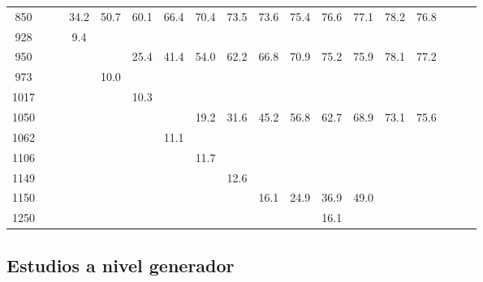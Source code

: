 \begin{table}[ht]
\begin{tabular}{c|ccccccccccccccccc}
    850  &         &        &  34.2    &   50.7   &   60.1   &   66.4   &   70.4    &   73.5    &    73.6  &   75.4  &   76.6 & 77.1 & 78.2 &  76.8 \\
    928  &         &        &   9.4    &          &          &          &           &           &          &         &        &      &      &       \\
    950  &         &        &          &          &   25.4   &   41.4   &   54.0    &   62.2    &    66.8  &   70.9  &   75.2 & 75.9 & 78.1 &  77.2 \\
    973  &         &        &          &   10.0   &          &          &           &           &          &         &        &      &      &       \\
    1017 &         &        &          &          &   10.3   &          &           &           &          &         &        &      &      &       \\
    1050 &         &        &          &          &          &          &   19.2    &   31.6    &    45.2  &   56.8  &   62.7 & 68.9 & 73.1 &  75.6 \\
    1062 &         &        &          &          &          &   11.1   &           &           &          &         &        &      &      &       \\
    1106 &         &        &          &          &          &          &   11.7    &           &          &         &        &      &      &       \\
    1149 &         &        &          &          &          &          &           &   12.6    &          &         &        &      &      &       \\
    1150 &         &        &          &          &          &          &           &           &    16.1  &   24.9  &   36.9 & 49.0 &      &       \\
    1250 &         &        &          &          &          &          &           &           &          &         &   16.1 &      &      &       \\
    \hline
  \end{tabular}
  \label{tab:signal_filter_eff}
\end{table}



\subsection{Estudios a nivel generador}
\label{sec:susy_studies}

